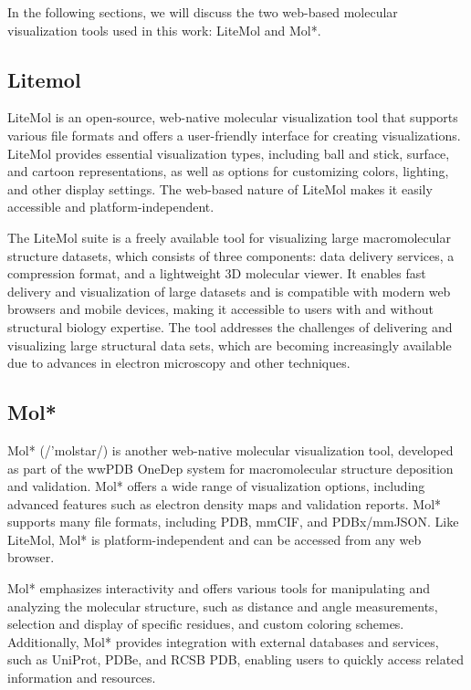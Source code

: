 \documentclass[
  digital,     %
  oneside,     %
  nosansbold,  %
  nocolorbold, %
  lof,         %
  lot,         %
]{fithesis4}
\begin{document}
In the following sections, we will discuss the two web-based molecular visualization tools used in this work: LiteMol and Mol*.

\subsection{Litemol}
\label{subsection:litemol}

LiteMol is an open-source, web-native molecular visualization tool that supports various file formats and offers a user-friendly interface for creating visualizations. LiteMol provides essential visualization types, including ball and stick, surface, and cartoon representations, as well as options for customizing colors, lighting, and other display settings. The web-based nature of LiteMol makes it easily accessible and platform-independent.

The LiteMol suite is a freely available tool for visualizing large macromolecular structure datasets, which consists of three components: data delivery services, a compression format, and a lightweight 3D molecular viewer. It enables fast delivery and visualization of large datasets and is compatible with modern web browsers and mobile devices, making it accessible to users with and without structural biology expertise. The tool addresses the challenges of delivering and visualizing large structural data sets, which are becoming increasingly available due to advances in electron microscopy and other techniques. \cite{sehnal2017litemol}

\subsection{Mol*}
\label{subsection:molstar}

Mol* (/'molstar/) is another web-native molecular visualization tool, developed as part of the wwPDB OneDep system for macromolecular structure deposition and validation. Mol* offers a wide range of visualization options, including advanced features such as electron density maps and validation reports. Mol* supports many file formats, including PDB, mmCIF, and PDBx/mmJSON. Like LiteMol, Mol* is platform-independent and can be accessed from any web browser. \cite{sehnal2021molstar}

Mol* emphasizes interactivity and offers various tools for manipulating and analyzing the molecular structure, such as distance and angle measurements, selection and display of specific residues, and custom coloring schemes. Additionally, Mol* provides integration with external databases and services, such as UniProt, PDBe, and RCSB PDB, enabling users to quickly access related information and resources.
\end{document}
